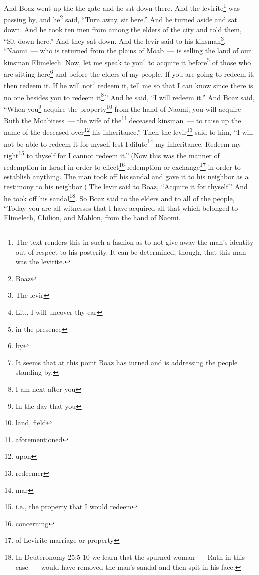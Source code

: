 

\begin{enumerate*}[mode=unboxed]
     And Boaz went up the the gate and he sat down there. And the levirite\footnote{The text renders this in such a fashion as to not give away the man's identity out of respect to his posterity. It can be determined, though, that this man was the levirite.} was passing by, and he\footnote{Boaz} said, ``Turn away, sit here.'' And he turned aside and sat down.%
     And he took ten men from among the elders of the city and told them, ``Sit down here.'' And they sat down.%
     And the levir said to his kinsman\footnote{The levir}, ``Naomi~--- who is returned from the plains of Moab~--- is selling the land of our kinsman Elimelech.%
     Now, let me speak to you\footnote{Lit., I will uncover thy ear} to acquire it before\footnote{in the presence} of those who are sitting here\footnote{by} and before the elders of my people. If you are going to redeem it, then redeem it. If he will not\footnote{It seems that at this point Boaz has turned and is addressing the people standing by.} redeem it, tell me so that I can know since there is no one besides you to redeem it\footnote{I am next after you}.'' And he said, ``I will redeem it.''%
     And Boaz said, ``When you\footnote{In the day that you} acquire the property\footnote{land, field} from the hand of Naomi, you will acquire Ruth the Moabitess~--- the wife of the\footnote{aforementioned} deceased kinsman~--- to raise up the name of the deceased over\footnote{upon} his inheritance.''%
     Then the levir\footnote{redeemer} said to him, ``I will not be able to redeem it for myself lest I dilute\footnote{mar} my inheritance. Redeem my right\footnote{i.e., the property that I would redeem} to thyself for I cannot redeem it.''%
     (Now this was the manner of redemption in Israel in order to effect\footnote{concerning} redemption or exchange\footnote{of Levirite marriage or property} in order to establish anything. The man took off his sandal and gave it to his neighbor as a testimony to his neighbor.)%
     The levir said to Boaz, ``Acquire it for thyself.'' And he took off his sandal\footnote{In Deuteronomy 25:5-10 we learn that the spurned woman~--- Ruth in this case~--- would have removed the man's sandal and then spit in his face.}.%
     So Boaz said to the elders and to all of the people, ``Today you are all witnesses that I have acquired all that which belonged to Elimelech, Chilion, and Mahlon, from the hand of Naomi.%

\end{enumerate*}

